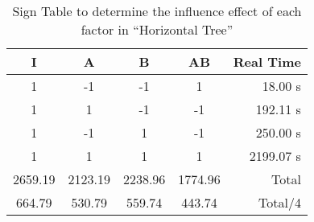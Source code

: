 \begin{table}[h]
	\caption{Sign Table to determine the influence effect of each factor in ``Horizontal Tree''}
	\center
	\begin{tabular}{ c c c c r }
		\hline
		I & A & B & AB & Real Time \\
		\hline
		1 & -1 & -1 &  1 &   18.00 s \\
		1 &  1 & -1 & -1 &  192.11 s \\
		1 & -1 &  1 & -1 &  250.00 s \\
		1 &  1 &  1 &  1 & 2199.07 s \\
		\hline
		2659.19 & 2123.19 & 2238.96 & 1774.96 & Total \\
		664.79 & 530.79 & 559.74 & 443.74 & Total/4 \\
		\hline
	\end{tabular}
\end{table}